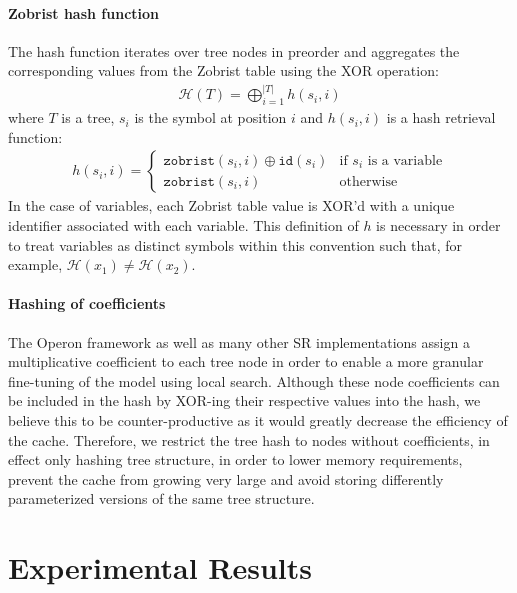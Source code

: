 \documentclass[openacc]{rstransa}%
\begin{document}
\paragraph{Zobrist hash function} The hash function iterates over tree nodes in preorder and aggregates the corresponding values from the Zobrist table using the XOR operation:
\begin{align}
    \mathcal{H}(T) = \bigoplus_{i=1}^{|T|} h\left( s_i, i \right)
\end{align}
where $T$ is a tree, $s_i$ is the symbol at position $i$ and $h(s_i, i)$ is a hash retrieval function:
\begin{align}
    h(s_i, i) = \begin{cases}
        \texttt{zobrist}(s_i, i) \oplus \texttt{id}(s_i) & \text{if $s_i$ is a variable} \\
        \texttt{zobrist}(s_i, i) & \text{otherwise}
    \end{cases}
\end{align}
%
In the case of variables, each Zobrist table value is XOR'd with a unique identifier associated with each variable. This definition of $h$ is necessary in order to treat variables as distinct symbols within this convention such that, for example, $\mathcal{H}({x_1}) \neq \mathcal{H}\left({x_2}\right)$.
%

\paragraph{Hashing of coefficients}
The Operon framework as well as many other SR implementations assign a multiplicative coefficient to each tree node in order to enable a more granular fine-tuning of the model using local search. Although these node coefficients can be included in the hash by XOR-ing their respective values into the hash, we believe this to be counter-productive as it would greatly decrease the efficiency of the cache. Therefore, we restrict the tree hash to nodes without coefficients, in effect only hashing tree structure, in order to lower memory requirements, prevent the cache from growing very large and avoid storing differently parameterized versions of the same tree structure.

\section{Experimental Results}\label{sec:results}
\end{document}
